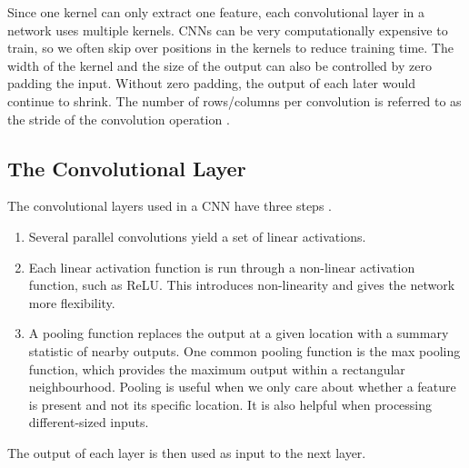 \documentclass{article}
\begin{document}
  Since one kernel can only extract one feature, each convolutional layer in a network uses multiple kernels. CNNs can be very computationally expensive to train, so we often skip over positions in the kernels to reduce training time. The width of the kernel and the size of the output can also be controlled by zero padding the input. Without zero padding, the output of each later would continue to shrink. The number of rows/columns per convolution is referred to as the stride of the convolution operation \cite{Goodfellow-et-al-2016}. %

\subsection{The Convolutional Layer}

The convolutional layers used in a CNN have three steps \cite{Goodfellow-et-al-2016}.

\begin{enumerate}
    \item Several parallel convolutions yield a set of linear activations.
    \item Each linear activation function is run through a non-linear activation function, such as ReLU. This introduces non-linearity and gives the network more flexibility. %
    \item A pooling function replaces the output at a given location with a summary statistic of nearby outputs. One common pooling function is the max pooling function, which provides the maximum output within a rectangular neighbourhood. Pooling is useful when we only care about whether a feature is present and not its specific location. It is also helpful when processing different-sized inputs.
\end{enumerate}

The output of each layer is then used as input to the next layer.
\end{document}
